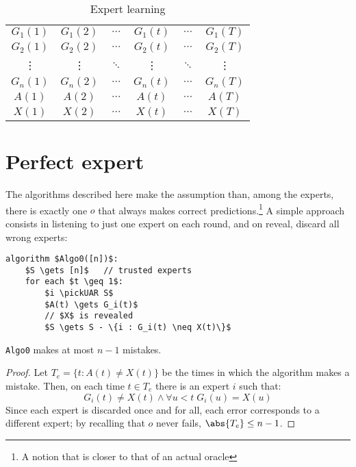 \begin{table}[ht]
    \centering
    \begin{tabular}{|cccccc|}
        \hline
        $G_1(1)$ & $G_1(2)$ & $\cdots$ & $G_1(t)$ & $\cdots$ & $G_1(T)$ \\
        $G_2(1)$ & $G_2(2)$ & $\cdots$ & $G_2(t)$ & $\cdots$ & $G_2(T)$ \\
        \vdots   & \vdots   & $\ddots$ & \vdots   & $\ddots$ & \vdots   \\
        $G_n(1)$ & $G_n(2)$ & $\cdots$ & $G_n(t)$ & $\cdots$ & $G_n(T)$ \\
        \hline
        $A(1)$   & $A(2)$   & $\cdots$ & $A(t)$   & $\cdots$ & $A(T)$   \\
        \hline
        $X(1)$   & $X(2)$   & $\cdots$ & $X(t)$   & $\cdots$ & $X(T)$   \\
        \hline
    \end{tabular}
    \caption{Expert learning}
    \label{tab:experts}
\end{table}

\section{Perfect expert}

The algorithms described here make the assumption than, among the experts, there is exactly one $o$ that always makes correct predictions.\footnote{A notion that is closer to that of an actual oracle} A simple approach consists in listening to just one expert on each round, and on reveal, discard all wrong experts:

\begin{lstlisting}[caption = {Algo 0}, label = {lst:exp-algo0}]
algorithm $Algo0([n])$:
    $S \gets [n]$   // trusted experts
    for each $t \geq 1$:
        $i \pickUAR S$
        $A(t) \gets G_i(t)$
        // $X$ is revealed
        $S \gets S - \{i : G_i(t) \neq X(t)\}$
\end{lstlisting}


\begin{lemma}\label{lem:exp-algo0-errors}
    \texttt{Algo0} makes at most $n - 1$ mistakes.
\end{lemma}

\begin{proof}
    Let $T_e = \{t : A(t) \neq X(t)\}$ be the times in which the algorithm makes a mistake. Then, on each time $t \in T_e$ there is an expert $i$ such that:
    \[
        G_i(t) \neq X(t) \wedge \forall u < t \; G_i(u) = X(u)
    \]
    Since each expert is discarded once and for all, each error corresponds to a different expert; by recalling that $o$ never fails, $\abs{T_e} \leq n - 1$.
\end{proof}

